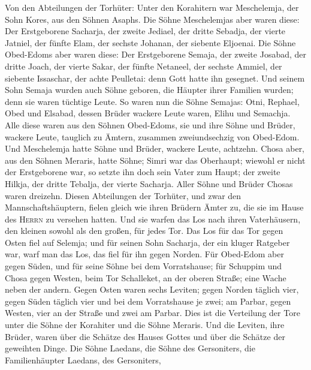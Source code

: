  Von den Abteilungen der Torhüter: Unter den Korahitern
war Meschelemja, der Sohn Kores, aus den Söhnen Asaphs. 
Die Söhne Meschelemjas aber waren diese: Der Erstgeborene Sacharja, der
zweite Jediael, der dritte Sebadja, der vierte Jatniel, 
der fünfte Elam, der sechste Johanan, der siebente Eljoenai.
 Die Söhne Obed-Edoms aber waren diese: Der Erstgeborene
Semaja, der zweite Josabad, der dritte Joach, der vierte Sakar, der
fünfte Netaneel,  der sechste Ammiel, der siebente
Issaschar, der achte Peulletai: denn Gott hatte ihn gesegnet.
 Und seinem Sohn Semaja wurden auch Söhne geboren, die
Häupter ihrer Familien wurden; denn sie waren tüchtige Leute.
 So waren nun die Söhne Semajas: Otni, Rephael, Obed und
Elsabad, dessen Brüder wackere Leute waren, Elihu und Semachja.
 Alle diese waren aus den Söhnen Obed-Edoms, sie und ihre
Söhne und Brüder, wackere Leute, tauglich zu Ämtern, zusammen
zweiundsechzig von Obed-Edom.  Und Meschelemja hatte Söhne
und Brüder, wackere Leute, achtzehn.  Chosa aber, aus den
Söhnen Meraris, hatte Söhne; Simri war das Oberhaupt; wiewohl er nicht
der Erstgeborene war, so setzte ihn doch sein Vater zum Haupt;
 der zweite Hilkja, der dritte Tebalja, der vierte
Sacharja. Aller Söhne und Brüder Chosas waren dreizehn. 
Diesen Abteilungen der Torhüter, und zwar den Mannschaftshäuptern,
fielen gleich wie ihren Brüdern Ämter zu, die sie im Hause des
\textsc{Herrn} zu versehen hatten.  Und sie warfen das
Los nach ihren Vaterhäusern, den kleinen sowohl als den großen, für
jedes Tor.  Das Los für das Tor gegen Osten fiel auf
Selemja; und für seinen Sohn Sacharja, der ein kluger Ratgeber war, warf
man das Los, das fiel für ihn gegen Norden.  Für
Obed-Edom aber gegen Süden, und für seine Söhne bei dem Vorratshause;
 für Schuppim und Chosa gegen Westen, beim Tor
Schalleket, an der oberen Straße; eine Wache neben der andern.
 Gegen Osten waren sechs Leviten; gegen Norden täglich
vier, gegen Süden täglich vier und bei dem Vorratshause je zwei;
 am Parbar, gegen Westen, vier an der Straße und zwei am
Parbar.  Dies ist die Verteilung der Tore unter die Söhne
der Korahiter und die Söhne Meraris.  Und die Leviten,
ihre Brüder, waren über die Schätze des Hauses Gottes und über die
Schätze der geweihten Dinge.  Die Söhne Laedans, die
Söhne des Gersoniters, die Familienhäupter Laedans, des Gersoniters,
